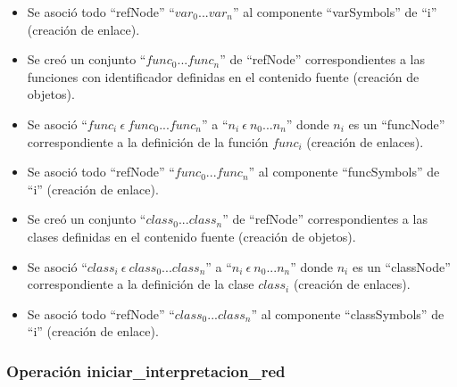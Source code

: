 \begin{description}
\begin {itemize}
         \item Se asoció todo ``refNode'' ``$var_0...var_n$'' al componente ``varSymbols'' de ``i'' (creación de enlace). 
         \item Se creó un conjunto ``$func_0...func_n$'' de ``refNode'' correspondientes a las funciones con identificador definidas en el contenido fuente (creación de objetos).
         \item Se asoció ``$func_i\ \epsilon\ func_0...func_n$'' a  ``$n_i\ \epsilon\ n_0...n_n$'' donde $n_i$ es un ``funcNode'' correspondiente a la definición de la función $func_i$ (creación de enlaces).
         \item Se asoció todo ``refNode'' ``$func_0...func_n$'' al componente ``funcSymbols'' de ``i'' (creación de enlace). 
         \item Se creó un conjunto ``$class_0...class_n$'' de ``refNode'' correspondientes a las clases definidas en el contenido fuente (creación de objetos).
         \item Se asoció ``$class_i\ \epsilon\ class_0...class_n$'' a  ``$n_i\ \epsilon\ n_0...n_n$'' donde $n_i$ es un ``classNode'' correspondiente a la definición de la clase $class_i$ (creación de enlaces).
         \item Se asoció todo ``refNode'' ``$class_0...class_n$'' al componente ``classSymbols'' de ``i'' (creación de enlace). 
      \end{itemize}
	\end{description}


\subsubsection{Operación iniciar\_interpretacion\_red}

